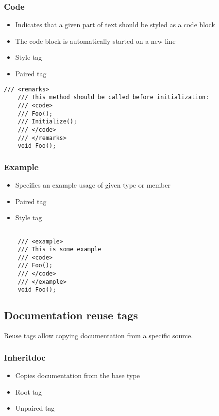 \subsubsection*{Code}
\begin{itemize}
    \item Indicates that a given part of text should be styled as a code block
    \item The code block is automatically started on a new line
    \item Style tag
    \item Paired tag
\end{itemize}

\begin{lstlisting}[caption=Code tag]
    /// <remarks>
    /// This method should be called before initialization:
    /// <code>
    /// Foo();
    /// Initialize();
    /// </code>
    /// </remarks>
    void Foo();
\end{lstlisting}

\subsubsection*{Example}
\begin{itemize}
    \item Specifies an example usage of given type or member
    \item Paired tag
    \item Style tag
\end{itemize}

\begin{lstlisting}[caption=Example tag]

    /// <example>
    /// This is some example
    /// <code>
    /// Foo();
    /// </code>
    /// </example>
    void Foo();

\end{lstlisting}

\subsection{Documentation reuse tags}

Reuse tags allow copying documentation from a specific source.

\subsubsection*{Inheritdoc} \label{sec:inheritdocTag}
\begin{itemize}
    \item Copies documentation from the base type
    \item Root tag
    \item Unpaired tag
\end{itemize}

